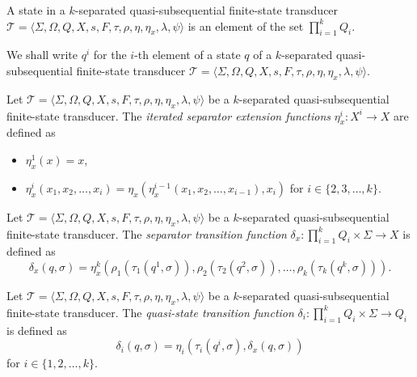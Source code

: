 \begin{definition}
  A state in a $k$-separated quasi-subsequential finite-state transducer $\mathcal{T}
  = \langle \Sigma, \Omega, Q, X, s, F, \tau, \rho, \eta, \eta_x, \lambda, \psi
  \rangle$ is an element of the set $\prod_{i=1}^k Q_i$.
\end{definition}

We shall write $q^i$ for the $i$-th element of a state $q$ of a $k$-separated
quasi-subsequential finite-state transducer $\mathcal{T} = \langle \Sigma, \Omega,
Q, X, s, F, \tau, \rho, \eta, \eta_x, \lambda, \psi \rangle$.

\begin{definition}
  Let $\mathcal{T} = \langle \Sigma, \Omega, Q, X, s, F, \tau, \rho, \eta, \eta_x,
  \lambda, \psi \rangle$ be a $k$-separated quasi-subsequential finite-state
  transducer. The \emph{iterated separator extension functions} $\eta_x^i : X^i
  \rightarrow X$ are defined as
  \begin{itemize}
    \item $\eta_x^1(x) = x$,
    \item $\eta_x^i(x_1, x_2, \ldots, x_i) = \eta_x(\eta_x^{i-1}(x_1, x_2, \ldots,
	    x_{i-1}), x_i)$ for $i \in \{ 2, 3, \ldots, k \}$.
  \end{itemize}
\end{definition}

\begin{definition}
  Let $\mathcal{T} = \langle \Sigma, \Omega, Q, X, s, F, \tau, \rho, \eta, \eta_x,
  \lambda, \psi \rangle$ be a $k$-separated quasi-subsequential finite-state
  transducer. The \emph{separator transition function} $\delta_x : \prod_{i=1}^k Q_i
  \times \Sigma \rightarrow X$ is defined as
  \begin{equation*}
    \delta_x(q, \sigma) = \eta_x^k(\rho_1(\tau_1(q^1, \sigma)), \rho_2(\tau_2(q^2,
    \sigma)), \ldots, \rho_k(\tau_k(q^k, \sigma))).
  \end{equation*}
\end{definition}

\begin{definition}
  Let $\mathcal{T} = \langle \Sigma, \Omega, Q, X, s, F, \tau, \rho, \eta, \eta_x,
  \lambda, \psi \rangle$ be a $k$-separated quasi-subsequential finite-state
  transducer. The \emph{quasi-state transition function} $\delta_i : \prod_{i=1}^k Q_i
  \times \Sigma \rightarrow Q_i$ is defined as
  \begin{equation*}
    \delta_i(q, \sigma) = \eta_i(\tau_i(q^i, \sigma), \delta_x(q, \sigma))
  \end{equation*}
  for $i \in \{ 1, 2, \ldots, k \}$.
\end{definition}

